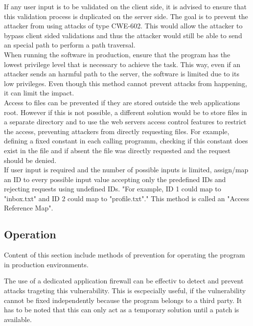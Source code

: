 If any user input is to be validated on the client side, it is advised to ensure that this validation process is duplicated on the server side. The goal is to prevent the attacker from using attacks of type CWE-602. This would allow the attacker to bypass client sided validations and thus the attacker would still be able to send an special path to perform a path traversal. \autocite{CWE22-Definition:online}\\
When running the software in production, ensure that the program has the lowest privilege level that is necessary to achieve the task. This way, even if an attacker sends an harmful path to the server, the software is limited due to its low privileges. Even though this method cannot prevent attacks from happening, it can limit the impact.\autocite{CWE22-Definition:online}\\
Access to files can be prevented if they are stored outside the web applications root. However if this is not possible, a different solution would be to store files in a separate directory and to use the web servers access control features to restrict the access, preventing attackers from directly requesting files. For example, defining a fixed constant in each calling programm, checking if this constant does exist in the file and if absent the file was directly requested and the request should be denied. \autocite{CWE22-Definition:online}\\
If user input is required and the number of possible inputs is limited, assign/map an ID to every possible input value accepting only the predefined IDs and rejecting requests using undefined IDs. \autocite{CWE22-Definition:online} "For example, ID 1 could map to "inbox.txt" and ID 2 could map to "profile.txt"." \autocite{CWE22-Definition:online} This method is called an "Access Reference Map".

\subsection{Operation}
\label{operation}
Content of this section include methods of prevention for operating the program in production environments.

The use of a dedicated application firewall can be effectiv to detect and prevent attacks trageting this vulnerability. This is escpecially useful, if the vulnerability cannot be fixed independently because the program belongs to a third party. \autocite{CWE22-Definition:online} It has to be noted that this can only act as a temporary solution until a patch is available.

